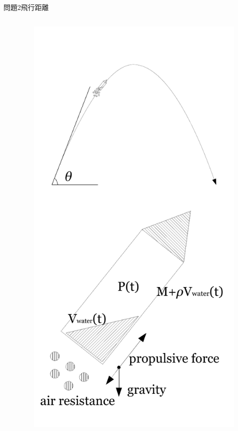 \documentclass[dvipdfmx]{beamer}
\begin{document}
\begin{frame}{問題2}{飛行距離}
\begin{columns}[t]
\begin{column}{0.7\textwidth}
\end{column}
\begin{column}{0.3\textwidth}
\begin{figure}[htbp]
    \centering
    \includegraphics[bb=0mm 0mm 100.0mm 170.0mm, scale=0.35, type=pdf]{img/problem2.pdf}
\end{figure}
\end{column}
\end{columns}
\end{frame}
\end{document}
